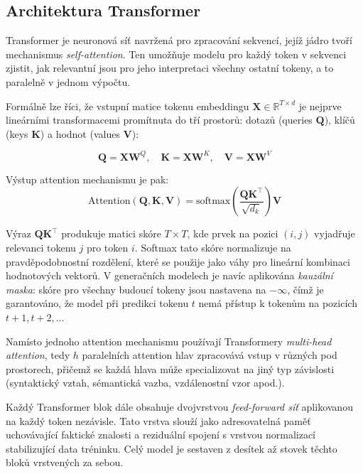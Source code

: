 \subsection{Architektura Transformer}
\label{subsec:transformer-architecture}

Transformer je neuronová síť navržená pro zpracování sekvencí, jejíž jádro tvoří mechanismus \textit{self-attention}\cite{vaswani-attention}.
Ten umožňuje modelu pro každý token v sekvenci zjistit, jak relevantní jsou pro jeho interpretaci všechny ostatní tokeny, a to paralelně v jednom výpočtu.

Formálně lze říci, že vstupní matice tokenu embeddingu $\mathbf{X} \in \mathbb{R}^{T \times d}$ je nejprve lineárními transformacemi promítnuta do tří prostorů: dotazů (queries $\mathbf{Q}$), klíčů (keys $\mathbf{K}$) a hodnot (values $\mathbf{V}$):

\begin{equation}
    \mathbf{Q} = \mathbf{X}\mathbf{W}^Q, \quad
    \mathbf{K} = \mathbf{X}\mathbf{W}^K, \quad
    \mathbf{V} = \mathbf{X}\mathbf{W}^V \label{eq:equation-qkv}
\end{equation}

Výstup attention mechanismu je pak\cite{vaswani-attention}:
\begin{equation}
    \text{Attention}(\mathbf{Q}, \mathbf{K}, \mathbf{V}) = \text{softmax}\!\left(\frac{\mathbf{Q}\mathbf{K}^\top}{\sqrt{d_k}}\right)\mathbf{V} \label{eq:equation-attention}
\end{equation}

Výraz $\mathbf{Q}\mathbf{K}^\top$ produkuje matici skóre $T \times T$, kde prvek na pozici $(i, j)$ vyjadřuje relevanci tokenu $j$ pro token $i$.
Softmax tato skóre normalizuje na pravděpodobnostní rozdělení, které se použije jako váhy pro lineární kombinaci hodnotových vektorů.
V generačních modelech je navíc aplikována \textit{kauzální maska}: skóre pro všechny budoucí tokeny jsou nastavena na $-\infty$, čímž je garantováno, že model při predikci tokenu $t$ nemá přístup k tokenům na pozicích $t+1, t+2, \ldots$

Namísto jednoho attention mechanismu používají Transformery \textit{multi-head attention}\cite{vaswani-attention}, tedy $h$ paralelních attention hlav zpracovává vstup v různých pod prostorech, přičemž se každá hlava může specializovat na jiný typ závislosti (syntaktický vztah, sémantická vazba, vzdálenostní vzor apod.).

Každý Transformer blok dále obsahuje dvojvrstvou \textit{feed-forward síť} aplikovanou na každý token nezávisle.
Tato vrstva slouží jako adresovatelná paměť uchovávající faktické znalosti a reziduální spojení s vrstvou normalizací stabilizující data tréninku\cite{vaswani-attention}.
Celý model je sestaven z desítek až stovek těchto bloků vrstvených za sebou.

\endinput